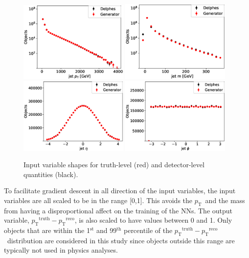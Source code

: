 \documentclass[showpacs,showkeys,preprint,prd,nofootinbib,linenumbers,12pt]{revtex4-1}
\def\pt{\ensuremath{p_{\mathrm{T}}}}
\def\ptRes{\ensuremath{\pt^{\mathrm{truth}}-\pt^{\mathrm{reco}}}}
\begin{document}
\begin{figure}[h]
  \includegraphics[width=0.48\textwidth]{figures/nn/jet_pT_prescaling_log.eps}
  \includegraphics[width=0.48\textwidth]{figures/nn/jet_m_prescaling_log.eps}\\
  \includegraphics[width=0.48\textwidth]{figures/nn/jet_eta_prescaling.eps}
  \includegraphics[width=0.48\textwidth]{figures/nn/jet_phi_prescaling.eps}
  \caption{Input variable shapes for truth-level (red) and detector-level quantities (black).}
  \label{fig:nnInputsPrescaling}
\end{figure}

To facilitate gradient descent in all direction of the input variables, the input variables are all scaled to be in the range [0,1]. This avoids the \pt\ and the mass from having a disproportional affect on the training of the NNs. The output variable, \ptRes, is also scaled to have values between 0 and 1. Only objects that 
are within the 1$^{\mathrm{st}}$ and 99$^{\mathrm{th}}$ percentile of the \ptRes\ distribution are considered in this study since objects outside this range are typically not used in physics analyses.
\end{document}
